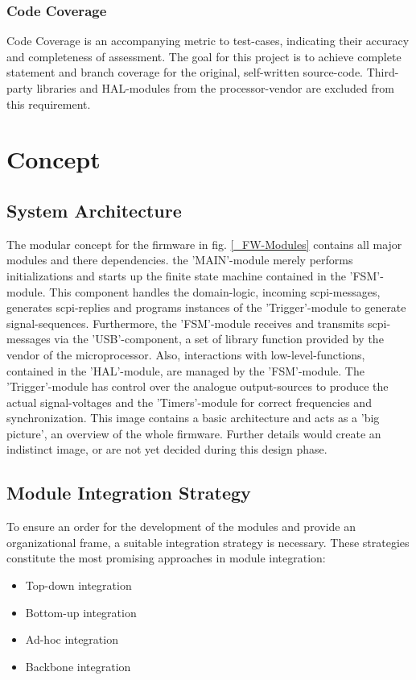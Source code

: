 \documentclass[master,english,smartquotes,apa]{hgbthesis}
\begin{document}
			\subsection{Code Coverage}
			Code Coverage is an accompanying metric to test-cases, indicating their accuracy and completeness of assessment. The goal for this project is to achieve complete statement and branch coverage for the original, self-written source-code. Third-party libraries and HAL-modules from the processor-vendor are excluded from this requirement.
			
	\chapter{Concept}
	\label{cha:Concept}
		\section{ System Architecture }
		The modular concept for the firmware in fig. \ref{_FW-Modules} contains all major modules and there dependencies. the 'MAIN'-module merely performs initializations and starts up the finite state machine contained in the 'FSM'-module. This component handles the domain-logic, incoming scpi-messages, generates scpi-replies and programs instances of the 'Trigger'-module to generate signal-sequences. Furthermore, the 'FSM'-module receives and transmits scpi-messages via the 'USB'-component, a set of library function provided by the vendor of the microprocessor. Also, interactions with low-level-functions, contained in the 'HAL'-module, are managed by the 'FSM'-module. The 'Trigger'-module has control over the analogue output-sources to produce the actual signal-voltages and the 'Timers'-module for correct frequencies and synchronization. This image contains a basic architecture and acts as a 'big picture', an overview of the whole firmware. Further details would create an indistinct image, or are not yet decided during this design phase.

		\section{Module Integration Strategy}
			To ensure an order for the development of the modules and provide an organizational frame, a suitable integration strategy is necessary. These strategies constitute the most promising approaches in module integration: \\
			\begin{itemize} \setlength\itemsep{1px}
			\item Top-down integration 
			\item Bottom-up integration 
			\item Ad-hoc integration 
			\item Backbone integration \\
			\end{itemize} 
\end{document}
